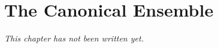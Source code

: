 \chapter{The Canonical Ensemble}\label{ch:b3:canonical-ensemble}


\emph{This chapter has not been written yet.}
